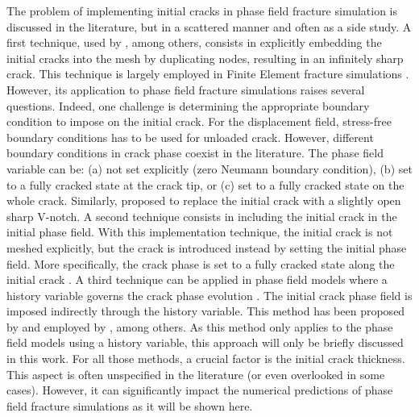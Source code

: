\documentclass[OptSoft]{jtcam_preprint}
\begin{document}
The problem of implementing initial cracks in phase field fracture simulation is discussed in the literature, but in a scattered manner and often as a side study.
A first technique, used by \textcite{klinsmann_assessment_2015,singh_fracture-controlled_2016,kristensen_assessment_2021}, among others, consists in explicitly embedding the initial cracks into the mesh by duplicating nodes, resulting in an infinitely sharp crack.
This technique is largely employed in Finite Element fracture simulations \parencite[Section 12.4.]{anderson_fracture_2017}.
However, its application to phase field fracture simulations raises several questions.
Indeed, one challenge is determining the appropriate boundary condition to impose on the initial crack.
For the displacement field, stress-free boundary conditions has to be used for unloaded crack.
However, different boundary conditions in crack phase coexist in the literature.
The phase field variable can be: (a) not set explicitly (zero Neumann boundary condition), (b) set to a fully cracked state at the crack tip, or (c) set to a fully cracked state on the whole crack.
Similarly, \textcite{tanne_crack_2018} proposed to replace the initial crack with a slightly open sharp V-notch.
A second technique consists in including the initial crack in the initial phase field.
With this implementation technique, the initial crack is not meshed explicitly, but the crack is introduced instead by setting the initial phase field.
More specifically, the crack phase is set to a fully cracked state along the initial crack \parencite{nguyen_phase_2015,makvandi_phase-field_2019, lo_phase-field_2019, yoshioka_crack_2020, kristensen_assessment_2021}.
A third technique can be applied in phase field models where a history variable governs the crack phase evolution \parencite{miehe_phase_2010}.
The initial crack phase field is imposed indirectly through the history variable.
This method has been proposed by \textcite{borden_phase-field_2012} and employed by \textcite{klinsmann_assessment_2015, pham_experimental_2017, liu_investigation_2020}, among others.
As this method only applies to the phase field models using a history variable, this approach will only be briefly discussed  in this work.
For all those methods, a crucial factor is the initial crack thickness.
This aspect is often unspecified in the literature (or even overlooked in some cases).
However, it can significantly impact the numerical predictions of phase field fracture simulations as it will be shown here.
\end{document}
